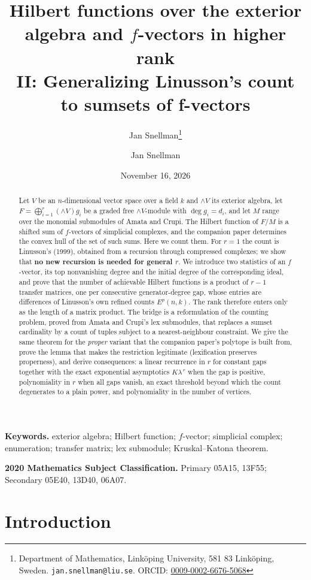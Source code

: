 \documentclass[11pt, a4paper, abstract=yes]{scrartcl}
\author{Jan Snellman\thanks{Department of Mathematics, Linköping University, 581 83 Linköping, Sweden. \texttt{jan.snellman@liu.se}. ORCID: \href{https://orcid.org/0009-0002-6676-5068}{0009-0002-6676-5068}}}
\author{Jan Snellman \orcidlink{0009-0002-6676-5068}}
\date{November 16, 2026}
\title{Hilbert functions over the exterior algebra and \(f\)-vectors in higher rank\\\medskip
\large II: Generalizing Linusson's count to sumsets of f-vectors}
\theoremstyle{definition}
\theoremstyle{remark}
\theoremstyle{plain}
\newcommand{\Ext}{\mathord{\wedge }V}
\let\autocite\cite
\begin{document}
\maketitle
\begin{abstract}
Let \(V\) be an \(n\)-dimensional vector space over a field \(k\) and \(\Ext\) its exterior algebra,
let \(F=\bigoplus_{i=1}^{r}(\Ext)g_i\) be a graded free \(\Ext\)-module with \(\deg g_i=d_i\), and let \(M\)
range over the monomial submodules of Amata and Crupi. The Hilbert function of \(F/M\) is a shifted
sum of \(f\)-vectors of simplicial complexes, and the companion paper \autocite{SnellmanArticle1} determines the convex hull of the
set of such sums. Here we count them. For \(r=1\) the count is Linusson's (1999), obtained from a
recursion through compressed complexes; we show that \textbf{no new recursion is needed for general
\(r\)}. We introduce two statistics of an \(f\)-vector, its top nonvanishing degree and the initial
degree of the corresponding ideal, and prove that the number of achievable Hilbert functions is a
product of \(r-1\) transfer matrices, one per consecutive generator-degree gap, whose entries are
differences of Linusson's own refined counts \(E^p(n,k)\). The rank therefore enters only as the
length of a matrix product. The bridge is a reformulation of the counting problem, proved from
Amata and Crupi's lex submodules, that replaces a sumset cardinality by a count of tuples subject to
a nearest-neighbour constraint. We give the same theorem for the \emph{proper} variant that the companion
paper's polytope is built from, prove the lemma that makes the restriction legitimate (lexification
preserves properness), and derive consequences: a linear recurrence in \(r\) for
constant gaps together with the exact exponential asymptotics \(K\lambda^{\,r}\) when the gap is
positive, polynomiality in \(r\) when all gaps vanish, an exact threshold beyond which the count
degenerates to a plain power, and polynomiality in the number of vertices.
\end{abstract}

\medskip\noindent\textbf{Keywords.} exterior algebra; Hilbert function; \(f\)-vector; simplicial
complex; enumeration; transfer matrix; lex submodule; Kruskal--Katona theorem.

\smallskip\noindent\textbf{2020 Mathematics Subject Classification.} Primary 05A15, 13F55;
Secondary 05E40, 13D40, 06A07.
\medskip

\setcounter{tocdepth}{2}
\tableofcontents
\section{Introduction}
\label{sec-intro}
\end{document}
